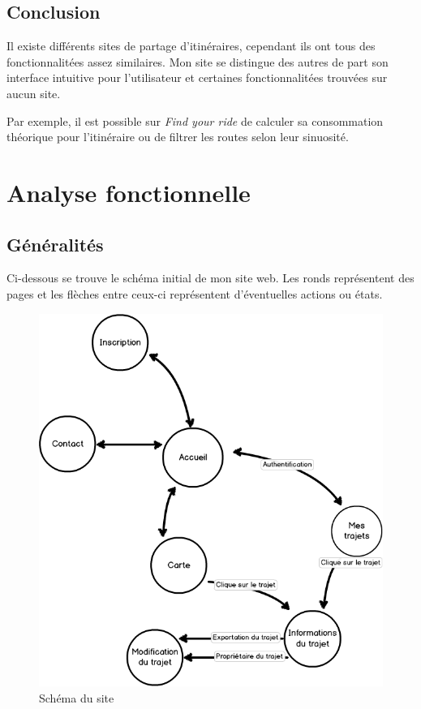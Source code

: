 \documentclass[a4paper]{article}
\newcommand{\fyr}{\emph{Find your ride }}
\begin{document}
\subsection{Conclusion}
Il existe différents sites de partage d'itinéraires, cependant ils ont tous des fonctionnalitées assez similaires. Mon site se distingue des autres de part son interface intuitive pour l'utilisateur et certaines fonctionnalitées trouvées sur aucun site.

Par exemple, il est possible sur \fyr de calculer sa consommation théorique pour l'itinéraire ou de filtrer les routes selon leur sinuosité.



\pagebreak

\section{Analyse fonctionnelle}

\subsection{Généralités}
Ci-dessous se trouve le schéma initial de mon site web. Les ronds représentent des pages et les flèches entre ceux-ci représentent d'éventuelles actions ou états.

\begin{figure}[h]
\centering
\includegraphics[width=\textwidth]{./Images/ShemaSite.png}
\caption{Schéma du site}
\end{figure}
\end{document}
